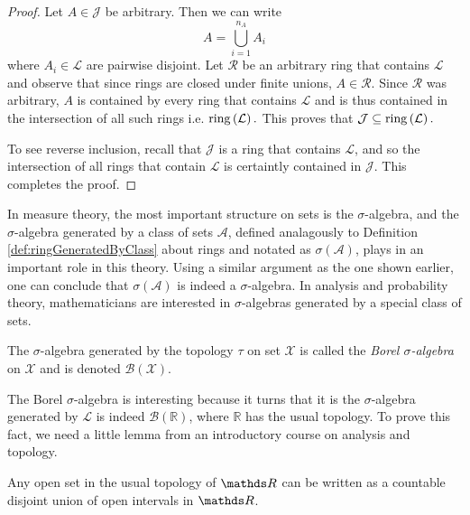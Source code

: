\begin{proof}
Let $A\in\mathcal{J}$ be arbitrary. Then we can write 
\[
A=\bigcup_{i=1}^{n_{A}}A_{i}
\]
where $A_{i}\in\mathcal{L}$ are pairwise disjoint. Let $\mathcal{R}$
be an arbitrary ring that contains $\mathcal{L}$ and observe that
since rings are closed under finite unions, $A\in\mathcal{R}.$ Since
$\mathcal{R}$ was arbitrary, $A$ is contained by every ring that
contains $\mathcal{L}$ and is thus contained in the intersection
of all such rings i.e. $\mathrm{ring}\left(\mathcal{L}\right).$ This proves
that $\mathcal{J}\subseteq\mathrm{ring}\left(\mathcal{L}\right).$

To see reverse inclusion, recall that $\mathcal{J}$ is a ring that
contains $\mathcal{L}$, and so the intersection of all rings that
contain $\mathcal{L}$ is certaintly contained in $\mathcal{J}$.
This completes the proof.
\end{proof}
In measure theory, the most important structure on sets is the $\sigma$-algebra,
and the $\sigma$-algebra generated by a class of sets $\mathcal{A}$,
defined analagously to Definition \ref{def:ringGeneratedByClass}
about rings and notated as $\sigma\left(\mathcal{A}\right)$, plays
in an important role in this theory. Using a similar argument as the
one shown earlier, one can conclude that $\sigma\left(\mathcal{A}\right)$
is indeed a $\sigma$-algebra. In analysis and probability theory,
mathematicians are interested in $\sigma$-algebras generated by a
special class of sets.
\begin{defn}
\label{def:borelSigma}The $\sigma$-algebra generated by the topology
$\tau$ on set $\mathcal{X}$ is called the \emph{Borel $\sigma$-algebra
}on $\mathcal{X}$ and is denoted $\mathscr{B}\left(\mathcal{X}\right)$.
\end{defn}

The Borel $\sigma$-algebra is interesting because it turns that it
is the $\sigma$-algebra generated by $\mathcal{L}$ is indeed $\mathscr{B}\left(\mathds{R}\right)$,
where $\mathds{R}$ has the usual topology. To prove this fact, we
need a little lemma from an introductory course on analysis and topology.
\begin{lem}
\label{lem:openSetDisjointUnionInterval} Any open set in the usual
topology of $\R$ can be written as a countable disjoint union of
open intervals in $\R$.
\end{lem}


